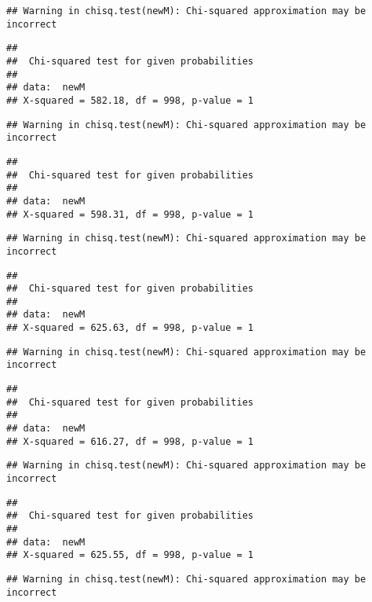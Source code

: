 \documentclass[]{article}
\begin{document}
\begin{verbatim}
## Warning in chisq.test(newM): Chi-squared approximation may be incorrect
\end{verbatim}

\begin{verbatim}
## 
##  Chi-squared test for given probabilities
## 
## data:  newM
## X-squared = 582.18, df = 998, p-value = 1
\end{verbatim}

\begin{verbatim}
## Warning in chisq.test(newM): Chi-squared approximation may be incorrect
\end{verbatim}

\begin{verbatim}
## 
##  Chi-squared test for given probabilities
## 
## data:  newM
## X-squared = 598.31, df = 998, p-value = 1
\end{verbatim}

\begin{verbatim}
## Warning in chisq.test(newM): Chi-squared approximation may be incorrect
\end{verbatim}

\begin{verbatim}
## 
##  Chi-squared test for given probabilities
## 
## data:  newM
## X-squared = 625.63, df = 998, p-value = 1
\end{verbatim}

\begin{verbatim}
## Warning in chisq.test(newM): Chi-squared approximation may be incorrect
\end{verbatim}

\begin{verbatim}
## 
##  Chi-squared test for given probabilities
## 
## data:  newM
## X-squared = 616.27, df = 998, p-value = 1
\end{verbatim}

\begin{verbatim}
## Warning in chisq.test(newM): Chi-squared approximation may be incorrect
\end{verbatim}

\begin{verbatim}
## 
##  Chi-squared test for given probabilities
## 
## data:  newM
## X-squared = 625.55, df = 998, p-value = 1
\end{verbatim}

\begin{verbatim}
## Warning in chisq.test(newM): Chi-squared approximation may be incorrect
\end{verbatim}
\end{document}
